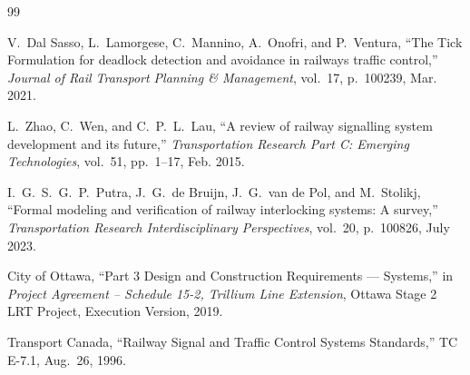 \documentclass[11pt,a4paper]{article}
\begin{document}
\begin{thebibliography}{99}

V.~Dal Sasso, L.~Lamorgese, C.~Mannino, A.~Onofri, and P.~Ventura, ``The Tick Formulation for deadlock detection and avoidance in railways traffic control,'' \emph{Journal of Rail Transport Planning \& Management}, vol.~17, p.~100239, Mar. 2021.

L.~Zhao, C.~Wen, and C.~P.~L.~Lau, ``A review of railway signalling system development and its future,'' \emph{Transportation Research Part C: Emerging Technologies}, vol.~51, pp.~1--17, Feb. 2015.

I.~G.~S.~G.~P.~Putra, J.~G.~de Bruijn, J.~G.~van de Pol, and M.~Stolikj, ``Formal modeling and verification of railway interlocking systems: A survey,'' \emph{Transportation Research Interdisciplinary Perspectives}, vol.~20, p.~100826, July 2023.

City of Ottawa, ``Part 3 Design and Construction Requirements --- Systems,'' in \emph{Project Agreement -- Schedule 15-2, Trillium Line Extension}, Ottawa Stage 2 LRT Project, Execution Version, 2019.

Transport Canada, ``Railway Signal and Traffic Control Systems Standards,'' TC E-7.1, Aug.~26, 1996.

\end{thebibliography}
\end{document}
